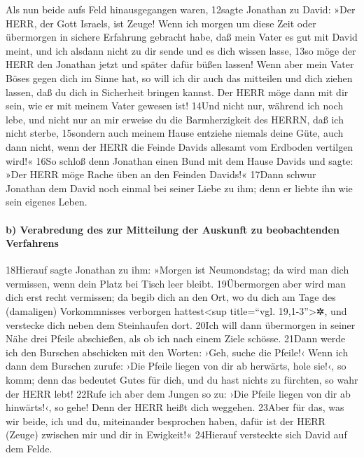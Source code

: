Als nun beide aufs Feld hinausgegangen waren, 12sagte Jonathan zu David:
»Der HERR, der Gott Israels, ist Zeuge! Wenn ich morgen um diese Zeit
oder übermorgen in sichere Erfahrung gebracht habe, daß mein Vater es
gut mit David meint, und ich alsdann nicht zu dir sende und es dich
wissen lasse, 13so möge der HERR den Jonathan jetzt und später dafür
büßen lassen! Wenn aber mein Vater Böses gegen dich im Sinne hat, so
will ich dir auch das mitteilen und dich ziehen lassen, daß du dich in
Sicherheit bringen kannst. Der HERR möge dann mit dir sein, wie er mit
meinem Vater gewesen ist! 14Und nicht nur, während ich noch lebe, und
nicht nur an mir erweise du die Barmherzigkeit des HERRN, daß ich nicht
sterbe, 15sondern auch meinem Hause entziehe niemals deine Güte, auch
dann nicht, wenn der HERR die Feinde Davids allesamt vom Erdboden
vertilgen wird!« 16So schloß denn Jonathan einen Bund mit dem Hause
Davids und sagte: »Der HERR möge Rache üben an den Feinden Davids!«
17Dann schwur Jonathan dem David noch einmal bei seiner Liebe zu ihm;
denn er liebte ihn wie sein eigenes Leben.

\hypertarget{b-verabredung-des-zur-mitteilung-der-auskunft-zu-beobachtenden-verfahrens}{%
\paragraph{b) Verabredung des zur Mitteilung der Auskunft zu
beobachtenden
Verfahrens}\label{b-verabredung-des-zur-mitteilung-der-auskunft-zu-beobachtenden-verfahrens}}

18Hierauf sagte Jonathan zu ihm: »Morgen ist Neumondstag; da wird man
dich vermissen, wenn dein Platz bei Tisch leer bleibt. 19Übermorgen aber
wird man dich erst recht vermissen; da begib dich an den Ort, wo du dich
am Tage des (damaligen) Vorkommnisses verborgen hattest\textless sup
title=``vgl. 19,1-3''\textgreater✲, und verstecke dich neben dem
Steinhaufen dort. 20Ich will dann übermorgen in seiner Nähe drei Pfeile
abschießen, als ob ich nach einem Ziele schösse. 21Dann werde ich den
Burschen abschicken mit den Worten: ›Geh, suche die Pfeile!‹ Wenn ich
dann dem Burschen zurufe: ›Die Pfeile liegen von dir ab herwärts, hole
sie!‹, so komm; denn das bedeutet Gutes für dich, und du hast nichts zu
fürchten, so wahr der HERR lebt! 22Rufe ich aber dem Jungen so zu: ›Die
Pfeile liegen von dir ab hinwärts!‹, so gehe! Denn der HERR heißt dich
weggehen. 23Aber für das, was wir beide, ich und du, miteinander
besprochen haben, dafür ist der HERR (Zeuge) zwischen mir und dir in
Ewigkeit!« 24Hierauf versteckte sich David auf dem Felde.

